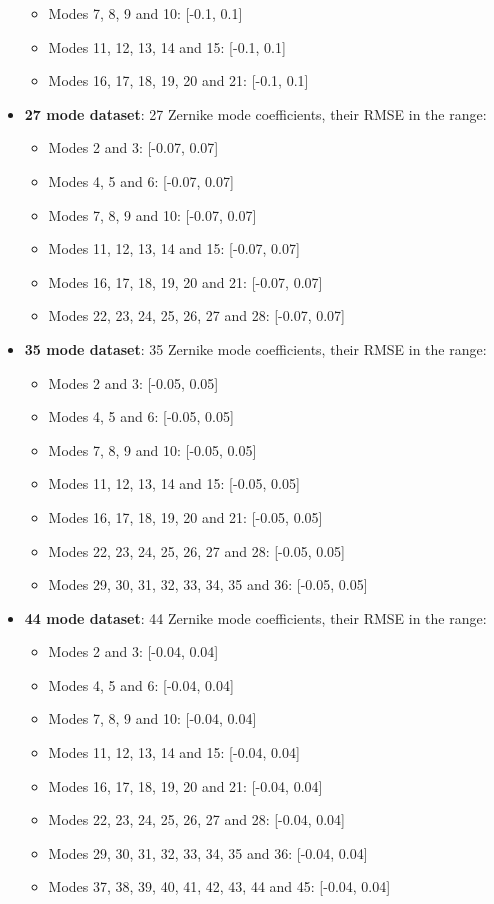 \begin{itemize}
\begin{itemize}
						\item Modes 7, 8, 9 and 10: [-0.1, 0.1]
						\item Modes 11, 12, 13, 14 and 15: [-0.1, 0.1]
						\item Modes 16, 17, 18, 19, 20 and 21: [-0.1, 0.1]
					\end{itemize}					 
				\item \textbf{27 mode dataset}: 27 Zernike mode coefficients, their RMSE in the range:
					\begin{itemize}
						\item Modes 2 and 3: [-0.07, 0.07]
						\item Modes 4, 5 and 6: [-0.07, 0.07]
						\item Modes 7, 8, 9 and 10: [-0.07, 0.07]
						\item Modes 11, 12, 13, 14 and 15: [-0.07, 0.07]
						\item Modes 16, 17, 18, 19, 20 and 21: [-0.07, 0.07]
						\item Modes 22, 23, 24, 25, 26, 27 and 28: [-0.07, 0.07]
					\end{itemize}					 
				\item \textbf{35 mode dataset}: 35 Zernike mode coefficients, their RMSE in the range:
					\begin{itemize}
						\item Modes 2 and 3: [-0.05, 0.05]
						\item Modes 4, 5 and 6: [-0.05, 0.05]
						\item Modes 7, 8, 9 and 10: [-0.05, 0.05]
						\item Modes 11, 12, 13, 14 and 15: [-0.05, 0.05]
						\item Modes 16, 17, 18, 19, 20 and 21: [-0.05, 0.05]
						\item Modes 22, 23, 24, 25, 26, 27 and 28: [-0.05, 0.05]
						\item Modes 29, 30, 31, 32, 33, 34, 35 and 36: [-0.05, 0.05]
					\end{itemize}					 
				\item \textbf{44 mode dataset}: 44 Zernike mode coefficients, their RMSE in the range:
					\begin{itemize}
						\item Modes 2 and 3: [-0.04, 0.04]
						\item Modes 4, 5 and 6: [-0.04, 0.04]
						\item Modes 7, 8, 9 and 10: [-0.04, 0.04]
						\item Modes 11, 12, 13, 14 and 15: [-0.04, 0.04]
						\item Modes 16, 17, 18, 19, 20 and 21: [-0.04, 0.04]
						\item Modes 22, 23, 24, 25, 26, 27 and 28: [-0.04, 0.04]
						\item Modes 29, 30, 31, 32, 33, 34, 35 and 36: [-0.04, 0.04]
						\item Modes 37, 38, 39, 40, 41, 42, 43, 44 and 45: [-0.04, 0.04]
					\end{itemize}					 
			\end{itemize}
			
